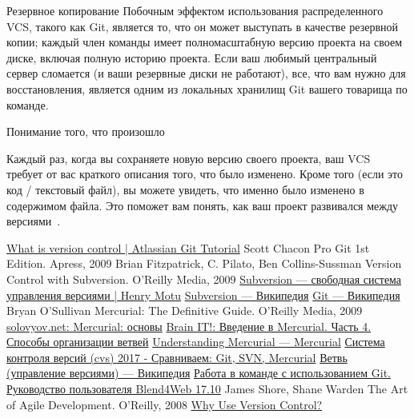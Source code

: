 \documentclass{../industrial-development}
\begin{document}
\lecturenotes

Резервное копирование
Побочным эффектом использования распределенного VCS, такого как Git, является то, что он может выступать в качестве резервной копии; каждый член команды имеет полномасштабную версию проекта на своем диске, включая полную историю проекта. Если ваш любимый центральный сервер сломается (и ваши резервные диски не работают), все, что вам нужно для восстановления, является одним из локальных хранилищ Git вашего товарища по команде.

Понимание того, что произошло

Каждый раз, когда вы сохраняете новую версию своего проекта, ваш VCS требует от вас краткого описания того, что было изменено. Кроме того (если это код / текстовый файл), вы можете увидеть, что именно было изменено в содержимом файла. Это поможет вам понять, как ваш проект развивался между версиями~\cite[171]{AgileDevelopment}.


\begin{thebibliography}{99}
 \href{https://www.atlassian.com/git/tutorials/what-is-version-control}{What is version control | Atlassian Git Tutorial}
 Scott Chacon Pro Git 1st Edition. Apress, 2009
 	Brian Fitzpatrick, C. Pilato, Ben Collins-Sussman Version Control with Subversion. O'Reilly Media, 2009
 \href{http://henry-motu.org.ua/2010/10/02/subversion-svobodnaja-sistema-upravkenija-versijam/}{Subversion --- свободная система управления версиями | Henry Motu}
 \href{https://ru.wikipedia.org/wiki/Subversion}{Subversion --- Википедия}
 \href{https://ru.wikipedia.org/wiki/Git}{Git --- Википедия}
 Bryan O'Sullivan Mercurial: The Definitive Guide. O'Reilly Media, 2009
 \href{https://solovyov.net/blog/2008/mercurial-basics/}{solovyov.net: Mercurial: основы}
 \href{http://brain-it.blogspot.ru/2010/01/mercurial-4.html}{Brain IT!: Введение в Mercurial. Часть 4. Способы организации ветвей}
 \href{https://www.mercurial-scm.org/wiki/RussianUnderstandingMercurial}{Understanding Mercurial --- Mercurial}
 \href{https://biz30.timedoctor.com/ru/cистема-контроля-версий/}{Система контроля версий (cvs) 2017 - Сравниваем: Git, SVN, Mercurial}
 \href{https://ru.wikipedia.org/wiki/Ветвь_(управление_версиями)}{Ветвь (управление версиями) — Википедия}
 \href{https://www.blend4web.com/doc/ru/git_short_manual.html}{Работа в команде с использованием Git. Руководство пользователя Blend4Web 17.10}
 James Shore, Shane Warden The Art of Agile Development. O'Reilly, 2008
 \href{https://www.git-tower.com/learn/git/ebook/en/command-line/basics/why-use-version-control}{Why Use Version Control?}
\end{thebibliography}
\end{document}
